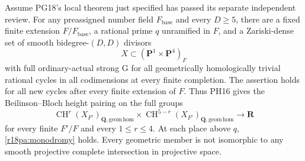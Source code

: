 \begin{theorem}
\label{r18pa:global}
Assume PG18's local theorem just specified has
passed its separate independent review.
For any preassigned number field $F_{\mathrm{base}}$
and every $D\ge5$, there are a fixed finite
extension $F/F_{\mathrm{base}}$, a rational
prime $q$ unramified in $F$, and a Zariski-dense
set of smooth bidegree-$(D,D)$ divisors
\[
                      X\subset(\mathbf P^1\times\mathbf P^4)_F
 \tag{PA18.6}\label{r18pa:family}
\]
with full ordinary-actual strong G for all
geometrically homologically trivial rational
cycles in all codimensions at every finite
completion.  The assertion holds for all
new cycles after every finite extension
of $F$.  Thus PH16 gives the Beilinson--Bloch
height pairing on the full groups
\[
 \operatorname{CH}^r(X_{F'})_{\mathbf Q,\mathrm{geom\,hom}}
 \times
 \operatorname{CH}^{5-r}(X_{F'})_{\mathbf Q,\mathrm{geom\,hom}}
                       \longrightarrow\mathbf R
 \tag{PA18.7}\label{r18pa:height}
\]
for every finite $F'/F$ and every $1\le r\le4$.
At each place above $q$, \eqref{r18pa:monodromy}
holds.  Every geometric member is not isomorphic
to any smooth projective complete intersection
in projective space.
\end{theorem}

